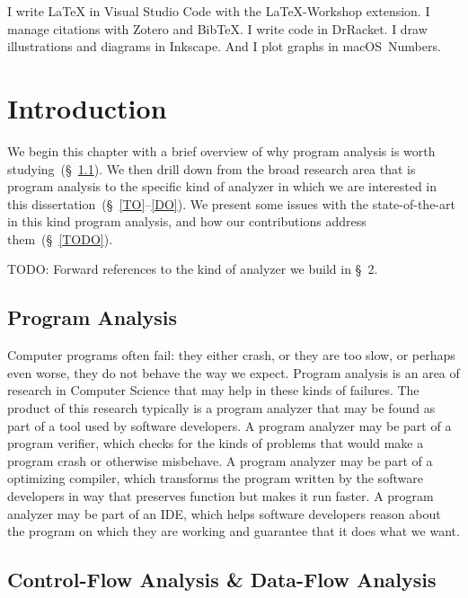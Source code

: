 \documentclass[12pt, oneside]{book}
\begin{document}
I write \LaTeX{} in Visual Studio Code with the LaTeX-Workshop extension. I manage citations with Zotero and Bib\TeX{}. I write code in DrRacket. I draw illustrations and diagrams in Inkscape. And I plot graphs in macOS~Numbers.

\tableofcontents
\listoftables
\listoffigures

\mainmatter

\chapter{Introduction}
\label{section:introduction}

We begin this chapter with a brief overview of why program analysis is worth studying~(§~\ref{section:program-analysis}). We then drill down from the broad research area that is program analysis to the specific kind of analyzer in which we are interested in this dissertation~(§~\ref{TO}–\ref{DO}). We present some issues with the state-of-the-art in this kind program analysis, and how our contributions address them~(§~\ref{TODO}).

TODO: Forward references to the kind of analyzer we build in §~2.

\section{Program Analysis}
\label{section:program-analysis}

Computer programs often fail: they either crash, or they are too slow, or perhaps even worse, they do not behave the way we expect. Program analysis is an area of research in Computer Science that may help in these kinds of failures. The product of this research typically is a program analyzer that may be found as part of a tool used by software developers. A program analyzer may be part of a program verifier, which checks for the kinds of problems that would make a program crash or otherwise misbehave. A program analyzer may be part of a optimizing compiler, which transforms the program written by the software developers in way that preserves function but makes it run faster. A program analyzer may be part of an IDE, which helps software developers reason about the program on which they are working and guarantee that it does what we want.

\section{Control-Flow Analysis \& Data-Flow Analysis}
\end{document}
